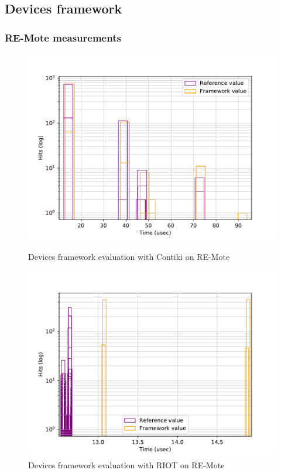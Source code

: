 \subsection{Devices framework}

\subsubsection{RE-Mote measurements}



\begin{figure}[!ht]
  \begin{minipage}{.45\textwidth}
      \centering
      \includegraphics[scale=.4]{assets/comparison-devices-framework-contiki-remote.pdf}
      \caption{Devices framework evaluation with Contiki on RE-Mote\label{fig:comparison-devices-framework-contiki-remote}}
  \end{minipage}\hfill
  \begin{minipage}{.45\textwidth}        
      \centering
      \includegraphics[scale=.4]{assets/comparison-devices-framework-riot-remote.pdf}
      \caption{Devices framework evaluation with RIOT on RE-Mote\label{fig:comparison-devices-framework-riot-remote}}
  \end{minipage}
\end{figure}

